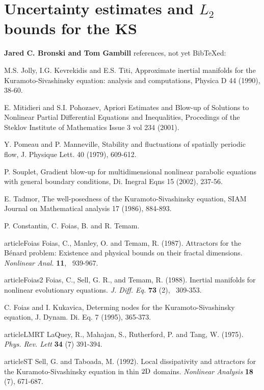
\section{Uncertainty estimates and $L_2$ bounds for the KS}

{\bf
Jared C. Bronski
and
Tom Gambill} references, not yet BibTeXed:

M.S. Jolly, I.G. Kevrekidis and E.S. Titi,
Approximate inertial manifolds for the {Kuramoto-Sivashinsky} equation:
analysis and computations,
Physica D 44 (1990), 38-60.

E. Mitidieri and S.I. Pohozaev,
Apriori Estimates and Blow-up of Solutions to Nonlinear Partial
Differential Equations and Inequalities,
Procedings of the Steklov Institute of Mathematics Issue 3 vol 234
(2001).

Y. Pomeau and P. Manneville,
Stability and fluctuations of spatially periodic flow,
J. Physique Lett. 40 (1979), 609-612.

P. Souplet,
Gradient blow-up for multidimensional nonlinear parabolic equations with
general boundary conditions,
Di. Inegral Eqns 15 (2002), 237-56.

E. Tadmor, The well-posedness of the {Kuramoto-Sivashinsky} equation,
SIAM Journal on Mathematical analysis 17 (1986), 884-893.

P. Constantin, C. Foias, B.  and R. Temam.

article{Foias}
Foias, C., Manley, O. and Temam, R. (1987).
Attractors for the {B\'{e}nard} problem:
{Existence} and physical bounds on their fractal dimensions.
{\it Nonlinear Anal.}
{\bf 11}, ~939-967.

article{Foias2}
Foias, C., Sell, G. R., and  Temam, R. (1988).
Inertial manifolds for nonlinear evolutionary equations.
{\it J. Diff. Eq.}
{\bf 73} (2), ~309-353.

C. Foias and I. Kukavica, Determing nodes for the {Kuramoto-Sivashinsky} equation,
J. Dynam. Di. Eq. 7 (1995), 365-373.



article{LMRT} LaQuey, R., Mahajan, S., Rutherford, P. and Tang, W. (1975).
{\it Phys. Rev. Lett} {\bf 34} (7) 391-394.

article{ST} Sell, G. and Taboada, M. (1992).
 Local dissipativity and attractors for the {Kuramoto-Sivashinsky}
equation in thin $2{\rm D}$ domains.
{\it Nonlinear Analysis} {\bf 18} (7), 671-687.
